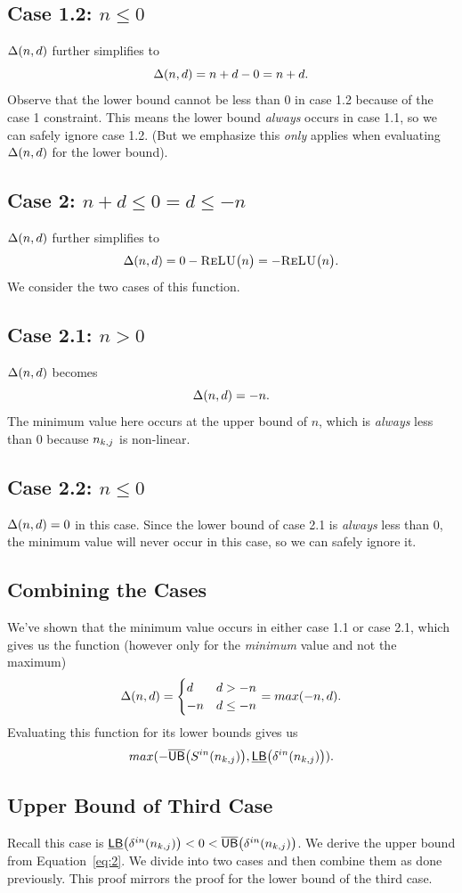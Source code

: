 \subsection*{Case 1.2: $ n \leq 0 $}
$ \Delta(n,d) $ further simplifies to
\[
	\Delta(n,d) = n + d - 0 = n + d.
\]
Observe that the lower bound cannot be less than 0 in case 1.2 because of the case 1 constraint.
This means the lower bound \textit{always} occurs in case 1.1, so we can safely ignore case 1.2. (But we emphasize this \textit{only} applies when evaluating $ \Delta(n,d) $ for the lower bound).

\subsection*{Case 2: $ n + d \leq 0 = d \leq -n $}
$ \Delta(n,d) $ further simplifies to
\[
	\Delta(n,d) = 0 - \textsc{ReLU}\big(n\big) = -\textsc{ReLU}\big(n\big).
\]
We consider the two cases of this function.
\subsection*{Case 2.1: $ n > 0 $}
$ \Delta(n,d) $ becomes
\[
	\Delta(n,d) = -n.
\]
The minimum value here occurs at the upper bound of $ n $, which is \textit{always} less than 0 because $ n_{k,j} $ is non-linear.

\subsection*{Case 2.2: $ n \leq 0 $}
$ \Delta(n,d) = 0 $ in this case. Since the lower bound of case 2.1 is \textit{always} less than 0, the minimum value will never occur in this case, so we can safely ignore it.


\subsection*{Combining the Cases}
We've shown that the minimum value occurs in either case 1.1 or case 2.1, which gives us the function (however only for the \textit{minimum} value and not the maximum)
\[
\Delta(n,d) = \begin{cases}
d & d > -n\\
-n & d \leq -n
\end{cases} = max(-n,d).
\]
Evaluating this function for its lower bounds gives us
\[
 max(-\overline{\mathsf{UB}}\big(S^{in}(n_{k,j})\big), \underline{\mathsf{LB}}\big(\delta^{in}(n_{k,j})\big)).
\]

\subsection{Upper Bound of Third Case}
Recall this case is $ \underline{\mathsf{LB}}\big(\delta^{in}(n_{k,j})\big) < 0 < \overline{\mathsf{UB}}\big(\delta^{in}(n_{k,j})\big) $. We derive the upper bound from Equation~\ref{eq:2}. We divide into two cases and then combine them as done previously. This proof mirrors the proof for the lower bound of the third case.

